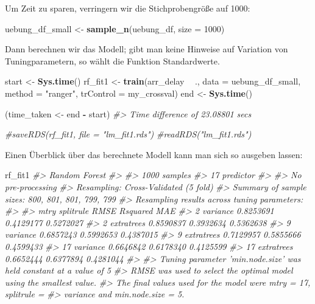 \documentclass[]{article}
\newenvironment{Shaded}{\begin{snugshade}}{\end{snugshade}}
\newcommand{\CommentTok}[1]{\textcolor[rgb]{0.56,0.35,0.01}{\textit{#1}}}
\newcommand{\DataTypeTok}[1]{\textcolor[rgb]{0.13,0.29,0.53}{#1}}
\newcommand{\DecValTok}[1]{\textcolor[rgb]{0.00,0.00,0.81}{#1}}
\newcommand{\KeywordTok}[1]{\textcolor[rgb]{0.13,0.29,0.53}{\textbf{#1}}}
\newcommand{\NormalTok}[1]{#1}
\newcommand{\OperatorTok}[1]{\textcolor[rgb]{0.81,0.36,0.00}{\textbf{#1}}}
\newcommand{\StringTok}[1]{\textcolor[rgb]{0.31,0.60,0.02}{#1}}
\begin{document}
Um Zeit zu sparen, verringern wir die Stichprobengröße auf 1000:

\begin{Shaded}
\begin{Highlighting}[]
\NormalTok{uebung_df_small <-}\StringTok{ }\KeywordTok{sample_n}\NormalTok{(uebung_df, }\DataTypeTok{size =} \DecValTok{1000}\NormalTok{)}
\end{Highlighting}
\end{Shaded}

Dann berechnen wir das Modell; gibt man keine Hinweise auf Variation von
Tuningparametern, so wählt die Funktion Standardwerte.

\begin{Shaded}
\begin{Highlighting}[]
\NormalTok{start <-}\StringTok{ }\KeywordTok{Sys.time}\NormalTok{()}
\NormalTok{rf_fit1 <-}\StringTok{ }\KeywordTok{train}\NormalTok{(arr_delay }\OperatorTok{~}\StringTok{ }\NormalTok{.,}
                 \DataTypeTok{data =}\NormalTok{ uebung_df_small,}
                 \DataTypeTok{method =} \StringTok{"ranger"}\NormalTok{,}
                 \DataTypeTok{trControl =}\NormalTok{ my_crossval)}
\NormalTok{end <-}\StringTok{ }\KeywordTok{Sys.time}\NormalTok{()}

\NormalTok{(time_taken <-}\StringTok{ }\NormalTok{end }\OperatorTok{-}\StringTok{ }\NormalTok{start)}
\CommentTok{#> Time difference of 23.08801 secs}

\CommentTok{#saveRDS(rf_fit1, file = "lm_fit1.rds")}
\CommentTok{#readRDS("lm_fit1.rds")}
\end{Highlighting}
\end{Shaded}

Einen Überblick über das berechnete Modell kann man sich so ausgeben
lassen:

\begin{Shaded}
\begin{Highlighting}[]
\NormalTok{rf_fit1}
\CommentTok{#> Random Forest }
\CommentTok{#> }
\CommentTok{#> 1000 samples}
\CommentTok{#>   17 predictor}
\CommentTok{#> }
\CommentTok{#> No pre-processing}
\CommentTok{#> Resampling: Cross-Validated (5 fold) }
\CommentTok{#> Summary of sample sizes: 800, 801, 801, 799, 799 }
\CommentTok{#> Resampling results across tuning parameters:}
\CommentTok{#> }
\CommentTok{#>   mtry  splitrule   RMSE       Rsquared   MAE      }
\CommentTok{#>    2    variance    0.8253691  0.4129177  0.5272027}
\CommentTok{#>    2    extratrees  0.8590837  0.3932634  0.5362638}
\CommentTok{#>    9    variance    0.6857243  0.5992653  0.4387015}
\CommentTok{#>    9    extratrees  0.7129957  0.5855666  0.4599433}
\CommentTok{#>   17    variance    0.6646842  0.6178340  0.4125599}
\CommentTok{#>   17    extratrees  0.6652444  0.6377894  0.4281044}
\CommentTok{#> }
\CommentTok{#> Tuning parameter 'min.node.size' was held constant at a value of 5}
\CommentTok{#> RMSE was used to select the optimal model using the smallest value.}
\CommentTok{#> The final values used for the model were mtry = 17, splitrule =}
\CommentTok{#>  variance and min.node.size = 5.}
\end{Highlighting}
\end{Shaded}
\end{document}
